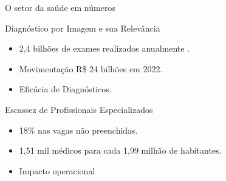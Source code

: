 \begin{frame}{O setor da saúde em números}

    \begin{block}{Diagnóstico por Imagem e sua Relevância}
        \begin{itemize}
            \item 2,4 bilhões de exames realizados anualmente \cite{Abramed_2023}.
            \item Movimentação R\$ 24 bilhões em 2022.
            \item Eficácia de Diagnósticos.
        \end{itemize}
    \end{block}
    
    \begingroup
    \begin{block}{Escassez de Profissionais Especializados \cite{Liebel_2021}}
        \begin{itemize}
            \item 18\% nas vagas não preenchidas.
            \item 1,51 mil médicos para cada 1,99 milhão de habitantes.
            \item Impacto operacional
        \end{itemize}
    \end{block}
    \endgroup

\end{frame}


    



